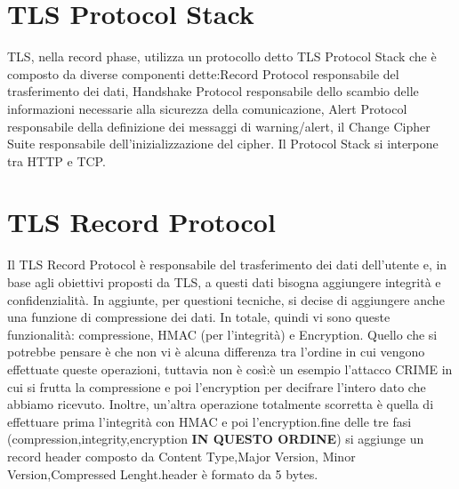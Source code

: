 \documentclass[a4paper,draft]{article}
\begin{document}
\section{TLS Protocol Stack}
TLS, nella record phase, utilizza un protocollo detto TLS Protocol Stack che è composto da diverse componenti dette:\@TLS Record Protocol responsabile del trasferimento dei dati, Handshake Protocol responsabile dello scambio delle informazioni necessarie alla sicurezza della comunicazione, Alert Protocol responsabile della definizione dei messaggi di warning/alert, il Change Cipher Suite responsabile dell'inizializzazione del cipher.
Il Protocol Stack si interpone tra HTTP e TCP\@.
\section{TLS Record Protocol}
Il TLS Record Protocol è responsabile del trasferimento dei dati dell'utente e, in base agli obiettivi proposti da TLS, a questi dati bisogna aggiungere integrità e confidenzialità. In aggiunte, per questioni tecniche, si decise di aggiungere anche una funzione di compressione dei dati. In totale, quindi vi sono queste funzionalità: compressione, HMAC (per l'integrità) e Encryption. Quello che si potrebbe pensare è che non vi è alcuna differenza tra l'ordine in cui vengono effettuate queste operazioni, tuttavia non è così:\@ne è un esempio l'attacco CRIME in cui si frutta la compressione e poi l'encryption per decifrare l'intero dato che abbiamo ricevuto. Inoltre, un'altra operazione totalmente scorretta è quella di effettuare prima l'integrità con HMAC e poi l'encryption.\@Alla fine delle tre fasi (compression,integrity,encryption \textbf{IN QUESTO ORDINE}) si aggiunge un record header composto da Content Type,Major Version, Minor Version,Compressed Lenght.\@Questo header è formato da 5 bytes.
\end{document}
